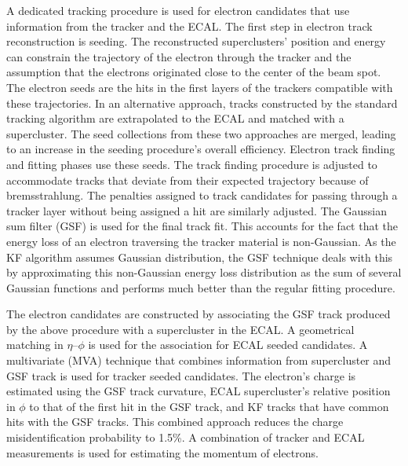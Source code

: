 A dedicated tracking procedure is used for electron candidates that use information from the tracker and the ECAL. The first step in electron track reconstruction is seeding. The reconstructed superclusters' position and energy can constrain the trajectory of the electron through the tracker and the assumption that the electrons originated close to the center of the beam spot. The electron seeds are the hits in the first layers of the trackers compatible with these trajectories. In an alternative approach, tracks constructed by the standard tracking algorithm are extrapolated to the ECAL and matched with a supercluster. The seed collections from these two approaches are merged, leading to an increase in the seeding procedure's overall efficiency. Electron track finding and fitting phases use these seeds. The track finding procedure is adjusted to accommodate tracks that deviate from their expected trajectory because of bremsstrahlung. The penalties assigned to track candidates for passing through a tracker layer without being assigned a hit are similarly adjusted. The Gaussian sum filter (GSF) is used for the final track fit. This accounts for the fact that the energy loss of an electron traversing the tracker material is non-Gaussian. As the KF algorithm assumes Gaussian distribution, the GSF technique deals with this by approximating this non-Gaussian energy loss distribution as the sum of several Gaussian functions and performs much better than the regular fitting procedure.

The electron candidates are constructed by associating the GSF track produced by the above procedure with a supercluster in the ECAL. A geometrical matching in $\eta$--$\phi$ is used for the association for ECAL seeded candidates. A multivariate (MVA) technique that combines information from supercluster and GSF track is used for tracker seeded candidates. The electron's charge is estimated using the GSF track curvature, ECAL supercluster's relative position in $\phi$ to that of the first hit in the GSF track, and KF tracks that have common hits with the GSF tracks. This combined approach reduces the charge misidentification probability to 1.5\%. A combination of tracker and ECAL measurements is used for estimating the momentum of electrons.

